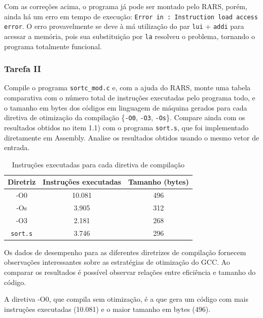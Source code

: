 \documentclass[a4paper,12pt]{article}
\newcommand{\cod}[1]{\texttt{#1}}
\begin{document}
Com as correções acima, o programa já pode ser montado pelo RARS, porém, ainda há um erro em tempo de execução: \cod{Error in : Instruction load access error}. O erro provavelmente se deve à má utilização do par \cod{lui} + \cod{addi} para acessar a memória, pois sua substituição por \cod{la} resolveu o problema, tornando o programa totalmente funcional.

\subsubsection{Tarefa II}
\begin{tcolorbox}[title=Enunciado, colback=blue!5!white, colframe=blue!75!black]
Compile o programa \cod{sortc\_mod.c} e, com a ajuda do RARS, monte uma tabela comparativa com o número total de instruções executadas pelo programa todo, e o tamanho em bytes dos códigos em linguagem de máquina gerados para cada diretiva de otimização da compilação \{\cod{-O0}, \cod{-O3}, \cod{-Os}\}. Compare ainda com os resultados obtidos no item 1.1) com o programa \cod{sort.s}, que foi implementado diretamente em Assembly. Analise os resultados obtidos usando o mesmo vetor de entrada.  
\end{tcolorbox}

\begin{table}[H]
\centering
\label{tab:results}
\small
\setlength{\tabcolsep}{3pt}
\begin{tabular}{@{}ccc@{}}
    \toprule
    \textbf{Diretriz} & \textbf{Instruções executadas} & \textbf{Tamanho (bytes)}\\
    \midrule
    -O0 & 10.081 & 496\\
    -Os & 3.905 & 312\\
    -O3 & 2.181 & 268\\
    \cod{sort.s} & 3.746 & 296\\
    \bottomrule
\end{tabular}
\caption{Instruções executadas para cada diretiva de compilação}
\vspace{-10pt}
\end{table}

Os dados de desempenho para as diferentes diretrizes de compilação fornecem observações interessantes sobre as estratégias de otimização do GCC. Ao comparar os resultados é possível observar relações entre eficiência e tamanho do código. 

A diretiva -O0, que compila sem otimização, é a que gera um código com mais instruções executadas (10.081) e o maior tamanho em bytes (496).
\end{document}
